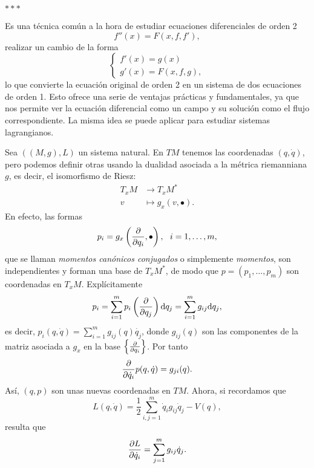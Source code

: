   \begin{center}  $\ast\ast\ast$ \end{center}

  Es una técnica común a la hora de estudiar ecuaciones diferenciales de orden 2 \[f''(x)=F(x,f,f'),\] realizar un cambio de la forma
  \begin{equation*}
    \left\lbrace
    \begin{array}{l}
      f'(x)=g(x) \\
      g'(x)=F(x,f,g),
    \end{array}
    \right.
  \end{equation*}
  lo que convierte la ecuación original de orden 2 en un sistema de dos ecuaciones de orden 1. Esto ofrece una serie de ventajas prácticas y fundamentales, ya que nos permite ver la ecuación diferencial como un campo y su solución como el flujo correspondiente. La misma idea se puede aplicar para estudiar sistemas lagrangianos.

  Sea $\left( (M,g), L \right)$ un sistema natural. En $TM$ tenemos las coordenadas $(q,\dot{q})$, pero podemos definir otras usando la dualidad asociada a la métrica riemanniana $g$, es decir, el isomorfismo de Riesz:
  \begin{align*}
    T_xM & \longrightarrow T_xM^* \\
    v & \longmapsto g_x(v,\bullet).
  \end{align*}
  En efecto, las formas 
  \begin{equation*}
    p_i = g_x\left(\frac{\partial}{\partial q_i},\bullet\right), \ \ i=1,\dots,m,
  \end{equation*}
  que se llaman \emph{momentos canónicos conjugados} o simplemente \emph{momentos}, son independientes y forman una base de $T_xM^*$, de modo que $p=(p_1,\dots,p_m)$ son coordenadas en $T_xM$. Explícitamente
  \begin{equation*}
    p_i= \sum_{i=1}^{m}p_i\left( \frac{\partial}{\partial q_j} \right)\mathrm{d} q_j = \sum_{i=1}^m g_{ij}\mathrm{d} q_j,
  \end{equation*}
  es decir, $p_i(q,\dot{q})=\sum_{i=1}^m g_{ij}(q) \dot{q_j}$, donde $g_{ij}(q)$ son las componentes de la matriz asociada a $g_x$ en la base $\left\lbrace \frac{\partial}{\partial q_i} \right\rbrace$. Por tanto
  \begin{equation*}
    \frac{\partial }{\partial \dot{q}_i}p(q,\dot{q})=g_{ji}(q).
  \end{equation*}
  Así, $(q,p)$ son unas nuevas coordenadas en $TM$. Ahora, si recordamos que 
  \begin{equation*}
    L(q,\dot{q})=\frac{1}{2}\sum_{i,j=1}^m \dot{q}_i g_{ij} \dot{q}_j - V(q),
  \end{equation*}
  resulta que
  \begin{equation*}
    \frac{\partial L}{\partial \dot{q}_i}=\sum_{j=1}^m g_{ij}\dot{q}_j.
  \end{equation*}

